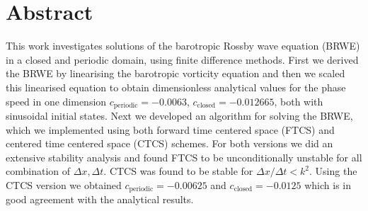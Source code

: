 \section*{Abstract}

This work investigates solutions of the barotropic Rossby wave equation (BRWE)
in a closed and periodic domain, using finite difference methods. First we
derived the BRWE  by linearising the barotropic vorticity equation and
then we scaled this linearised equation to obtain dimensionless analytical
values for the phase speed in one dimension $c_{\mathrm{periodic}} = -0.0063$,
$c_{\mathrm{closed}} = -0.012665$, both with sinusoidal initial states.
Next we developed an algorithm for solving the BRWE, which we implemented using
both forward time centered space (FTCS) and centered time centered space (CTCS) schemes.
For both versions we did an extensive stability analysis and found FTCS to be
unconditionally unstable for all combination of $\Delta x, \Delta t$. CTCS was
found to be stable for $\Delta x / \Delta t < k^2$. Using the CTCS version we
obtained $c_{\mathrm{periodic}}= - 0.00625$ and $c_{\mathrm{closed}} = -
0.0125$ which is in good agreement with the analytical results.

